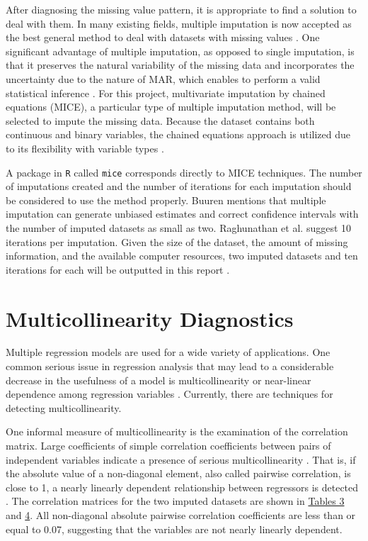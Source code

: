 \documentclass[11pt]{article}
\begin{document}
After diagnosing the missing value pattern, it is appropriate to find a solution to deal with them. In many existing fields, multiple imputation is now accepted as the best general method to deal with datasets with missing values \cite{bk:buuren}. One significant advantage of multiple imputation, as opposed to single imputation, is that it preserves the natural variability of the missing data and incorporates the uncertainty due to the nature of MAR, which enables to perform a valid statistical inference \cite{ar:kang}. For this project, multivariate imputation by chained equations (MICE), a particular type of multiple imputation method, will be selected to impute the missing data. Because the dataset contains both continuous and binary variables, the chained equations approach is utilized due to its flexibility with variable types \cite{ar:azur}.

A package in \texttt{R} called \texttt{mice} corresponds directly to MICE techniques. The number of imputations created and the number of iterations for each imputation should be considered to use the method properly. Buuren \cite{bk:buuren} mentions that multiple imputation can generate unbiased estimates and correct confidence intervals with the number of imputed datasets as small as two. Raghunathan et al. \cite{bk:raghunathan} suggest 10 iterations per imputation. Given the size of the dataset, the amount of missing information, and the available computer resources, two imputed datasets and ten iterations for each will be outputted in this report \cite{ar:azur}.


\section{Multicollinearity Diagnostics}
Multiple regression models are used for a wide variety of applications. One common serious issue in regression analysis that may lead to a considerable decrease in the usefulness of a model is multicollinearity or near-linear dependence among regression variables \cite{bk:montgomery}. Currently, there are techniques for detecting multicollinearity. 

One informal measure of multicollinearity is the examination of the correlation matrix. Large coefficients of simple correlation coefficients between pairs of independent variables indicate a presence of serious multicollinearity \cite{bk:kutner}. That is, if the absolute value of a non-diagonal element, also called pairwise correlation, is close to 1, a nearly linearly dependent relationship between regressors is detected \cite{bk:montgomery}. The correlation matrices for the two imputed datasets are shown in \hyperref[tab:cormat1]{Tables 3} and \hyperref[tab:cormat2]{4}. All non-diagonal absolute pairwise correlation coefficients are less than or equal to 0.07, suggesting that the variables are not nearly linearly dependent.
\end{document}
